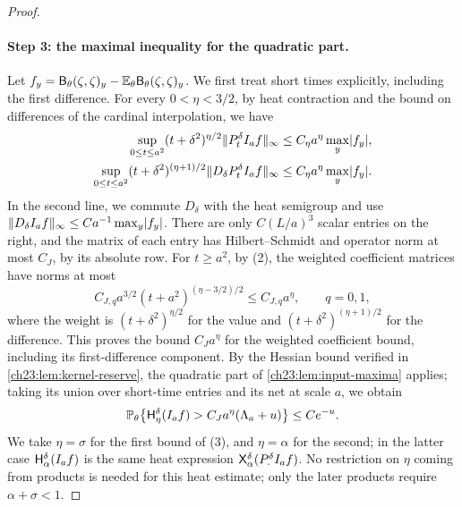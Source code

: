 \begin{proof}
\paragraph{Step 3: the maximal inequality for the quadratic part.}
Let $f_y=\mathsf B_\theta(\zeta,\zeta)_y-\mathbb E_\theta\mathsf B_\theta(\zeta,\zeta)_y$. We first treat short times explicitly, including the first difference. For every $0<\eta<3/2$, by heat contraction and the bound on differences of the cardinal interpolation, we have
\begin{align*}
 \sup_{0\le t\le a^2}(t+\delta^2)^{\eta/2}\lVert P_t^\delta I_af\rVert_\infty&\le C_\eta a^\eta\max_y\lvert f_y\rvert,\\
 \sup_{0\le t\le a^2}(t+\delta^2)^{(\eta+1)/2}\lVert D_\delta P_t^\delta I_af\rVert_\infty&\le C_\eta a^\eta\max_y\lvert f_y\rvert.
\end{align*}
In the second line, we commute $D_\delta$ with the heat semigroup and use $\lVert D_\delta I_af\rVert_\infty\le Ca^{-1}\max_y\lvert f_y\rvert$. There are only $C(L/a)^3$ scalar entries on the right, and the matrix of each entry has Hilbert--Schmidt and operator norm at most $C_J$, by its absolute row. For $t\ge a^2$, by (2), the weighted coefficient matrices have norms at most
\[
 C_{J,q}a^{3/2}(t+a^2)^{(\eta-3/2)/2}\le C_{J,q}a^\eta,\qquad q=0,1,
\]
where the weight is $(t+\delta^2)^{\eta/2}$ for the value and $(t+\delta^2)^{(\eta+1)/2}$ for the difference. This proves the bound $C_Ja^\eta$ for the weighted coefficient bound, including its first-difference component. By the Hessian bound verified in \cref{ch23:lem:kernel-reserve}, the quadratic part of \cref{ch23:lem:input-maxima} applies; taking its union over short-time entries and its net at scale $a$, we obtain
\[
 \mathbb P_\theta\bigl\{\mathsf H_{\eta}^{\delta}(I_af)>C_Ja^\eta(\Lambda_a+u)\bigr\}\le Ce^{-u}.
\]
We take $\eta=\sigma$ for the first bound of (3), and $\eta=\alpha$ for the second; in the latter case $\mathsf H_{\alpha}^{\delta}(I_af)$ is the same heat expression $\mathsf X_{\alpha}^{\delta}(P_\cdot^\delta I_af)$. No restriction on $\eta$ coming from products is needed for this heat estimate; only the later products require $\alpha+\sigma<1$.


\end{proof}
